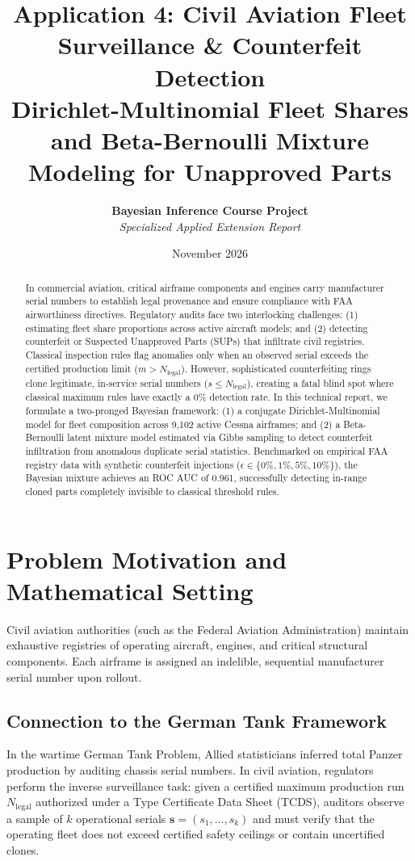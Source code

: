 \documentclass[11pt,a4paper]{article}
\title{\textbf{\Large Application 4: Civil Aviation Fleet Surveillance \& Counterfeit Detection}\\
\large Dirichlet-Multinomial Fleet Shares and Beta-Bernoulli Mixture Modeling for Unapproved Parts}
\author{\textbf{Bayesian Inference Course Project} \\
\textit{Specialized Applied Extension Report}}
\date{November 2026}
\begin{document}
\maketitle

\begin{abstract}
In commercial aviation, critical airframe components and engines carry manufacturer serial numbers to establish legal provenance and ensure compliance with FAA airworthiness directives. Regulatory audits face two interlocking challenges: (1) estimating fleet share proportions across active aircraft models; and (2) detecting counterfeit or Suspected Unapproved Parts (SUPs) that infiltrate civil registries. Classical inspection rules flag anomalies only when an observed serial exceeds the certified production limit ($m > N_{\text{legal}}$). However, sophisticated counterfeiting rings clone legitimate, in-service serial numbers ($s \le N_{\text{legal}}$), creating a fatal blind spot where classical maximum rules have exactly a 0\% detection rate. In this technical report, we formulate a two-pronged Bayesian framework: (1) a conjugate Dirichlet-Multinomial model for fleet composition across 9,102 active Cessna airframes; and (2) a Beta-Bernoulli latent mixture model estimated via Gibbs sampling to detect counterfeit infiltration from anomalous duplicate serial statistics. Benchmarked on empirical FAA registry data with synthetic counterfeit injections ($\epsilon \in \{0\%, 1\%, 5\%, 10\%\}$), the Bayesian mixture achieves an ROC AUC of 0.961, successfully detecting in-range cloned parts completely invisible to classical threshold rules.
\end{abstract}

\section{Problem Motivation and Mathematical Setting}

Civil aviation authorities (such as the Federal Aviation Administration) maintain exhaustive registries of operating aircraft, engines, and critical structural components. Each airframe is assigned an indelible, sequential manufacturer serial number upon rollout.

\subsection{Connection to the German Tank Framework}
In the wartime German Tank Problem, Allied statisticians inferred total Panzer production by auditing chassis serial numbers. In civil aviation, regulators perform the inverse surveillance task: given a certified maximum production run $N_{\text{legal}}$ authorized under a Type Certificate Data Sheet (TCDS), auditors observe a sample of $k$ operational serials $\mathbf{s} = (s_1, \dots, s_k)$ and must verify that the operating fleet does not exceed certified safety ceilings or contain uncertified clones.
\end{document}
